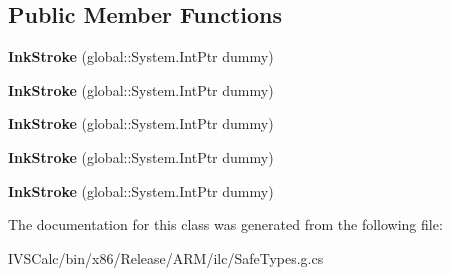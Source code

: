 \subsection*{Public Member Functions}
\begin{DoxyCompactItemize}
\item 
\mbox{\label{class_windows_1_1_u_i_1_1_input_1_1_inking_1_1_ink_stroke_aea3fbb9d73b965f4959e293c3b0575a1}} 
{\bfseries Ink\+Stroke} (global\+::\+System.\+Int\+Ptr dummy)
\item 
\mbox{\label{class_windows_1_1_u_i_1_1_input_1_1_inking_1_1_ink_stroke_aea3fbb9d73b965f4959e293c3b0575a1}} 
{\bfseries Ink\+Stroke} (global\+::\+System.\+Int\+Ptr dummy)
\item 
\mbox{\label{class_windows_1_1_u_i_1_1_input_1_1_inking_1_1_ink_stroke_aea3fbb9d73b965f4959e293c3b0575a1}} 
{\bfseries Ink\+Stroke} (global\+::\+System.\+Int\+Ptr dummy)
\item 
\mbox{\label{class_windows_1_1_u_i_1_1_input_1_1_inking_1_1_ink_stroke_aea3fbb9d73b965f4959e293c3b0575a1}} 
{\bfseries Ink\+Stroke} (global\+::\+System.\+Int\+Ptr dummy)
\item 
\mbox{\label{class_windows_1_1_u_i_1_1_input_1_1_inking_1_1_ink_stroke_aea3fbb9d73b965f4959e293c3b0575a1}} 
{\bfseries Ink\+Stroke} (global\+::\+System.\+Int\+Ptr dummy)
\end{DoxyCompactItemize}


The documentation for this class was generated from the following file\+:\begin{DoxyCompactItemize}
\item 
I\+V\+S\+Calc/bin/x86/\+Release/\+A\+R\+M/ilc/Safe\+Types.\+g.\+cs\end{DoxyCompactItemize}
